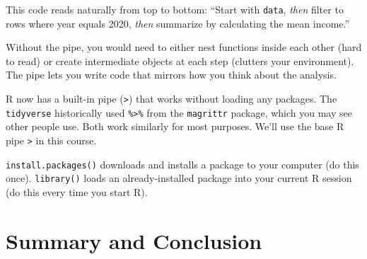 \documentclass[
  letterpaper,
  DIV=11,
  numbers=noendperiod]{scrreprt}
\begin{document}
This code reads naturally from top to bottom: ``Start with
\texttt{data}, \emph{then} filter to rows where year equals 2020,
\emph{then} summarize by calculating the mean income.''

Without the pipe, you would need to either nest functions inside each
other (hard to read) or create intermediate objects at each step
(clutters your environment). The pipe lets you write code that mirrors
how you think about the analysis.

\begin{tcolorbox}[enhanced jigsaw, arc=.35mm, bottomrule=.15mm, bottomtitle=1mm, breakable, colback=white, colbacktitle=quarto-callout-note-color!10!white, colframe=quarto-callout-note-color-frame, coltitle=black, left=2mm, leftrule=.75mm, opacityback=0, opacitybacktitle=0.6, rightrule=.15mm, title=\textcolor{quarto-callout-note-color}{\faInfo}\hspace{0.5em}{Base R Pipe vs.~Magrittr Pipe}, titlerule=0mm, toprule=.15mm, toptitle=1mm]

R now has a built-in pipe (\texttt{\textbar{}\textgreater{}}) that works
without loading any packages. The \texttt{tidyverse} historically used
\texttt{\%\textgreater{}\%} from the \texttt{magrittr} package, which
you may see other people use. Both work similarly for most purposes.
We'll use the base R pipe \texttt{\textbar{}\textgreater{}} in this
course.

\end{tcolorbox}

\begin{tcolorbox}[enhanced jigsaw, arc=.35mm, bottomrule=.15mm, bottomtitle=1mm, breakable, colback=white, colbacktitle=quarto-callout-important-color!10!white, colframe=quarto-callout-important-color-frame, coltitle=black, left=2mm, leftrule=.75mm, opacityback=0, opacitybacktitle=0.6, rightrule=.15mm, title=\textcolor{quarto-callout-important-color}{\faExclamation}\hspace{0.5em}{Remember the Difference}, titlerule=0mm, toprule=.15mm, toptitle=1mm]

\texttt{install.packages()} downloads and installs a package to your
computer (do this once). \texttt{library()} loads an already-installed
package into your current R session (do this every time you start R).

\end{tcolorbox}

\section{Summary and Conclusion}\label{summary-and-conclusion-3}
\end{document}
